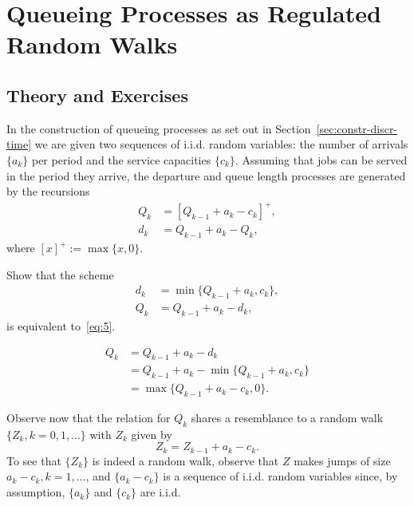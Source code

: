 \section{Queueing Processes as Regulated Random Walks}
\label{sec:queu-proc-as}

\subsection*{Theory and Exercises}




In the construction of queueing processes as set out in
Section~\ref{sec:constr-discr-time} we are given two sequences of
i.i.d. random variables: the number of arrivals $\{a_k\}$ per period
and the service capacities $\{c_k\}$. Assuming that jobs can be served
in the period they arrive, the departure and queue length processes
are generated by the recursions
\begin{equation}\label{eq:5}
  \begin{split}
  Q_k &= [Q_{k-1}+a_k - c_k]^+,\\
  d_k &= Q_{k-1} +a_k- Q_{k},
  \end{split}
\end{equation}
where $[x]^+ := \max\{x, 0\}$.  

\begin{exercise}[\faFlask]\label{ex:24}
  Show that the scheme
  \begin{align*}
    d_k &= \min\{Q_{k-1}+a_k, c_k\}, \\
    Q_k &= Q_{k-1} + a_k - d_k,
  \end{align*}
  is equivalent to~\eqref{eq:5}. 
\begin{solution}
  \begin{align*}
    Q_k &= Q_{k-1} + a_k - d_k \\ 
        &= Q_{k-1} + a_k - \min\{Q_{k-1}+a_k, c_k\} \\
        &= \max\{Q_{k-1} + a_k - c_k, 0 \}.
  \end{align*}
\end{solution}
\end{exercise}


Observe now that the relation for $Q_k$ shares a resemblance to a random walk $\{Z_k, k=0,1,\ldots\}$ with  $Z_k$ given by
\begin{equation}\label{eq:44}
  Z_k = Z_{k-1} + a_k - c_k.
\end{equation}
To see that $\{Z_k\}$ is indeed a random walk, observe that $Z$ makes  jumps of size $a_k-c_k, k=1,\ldots$, and $\{a_k-c_k\}$ is a sequence of i.i.d. random variables since, by assumption,  $\{a_k\}$ and $\{c_k\}$ are i.i.d.

